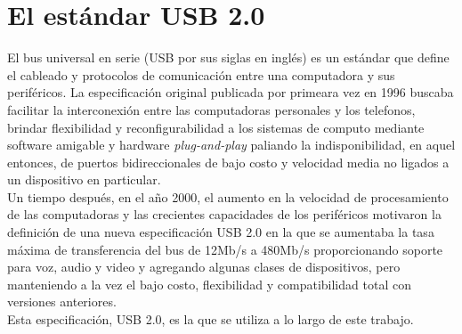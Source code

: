 \documentclass[letterpaper,openright,12pt]{book}
\begin{document}
\section{El estándar USB 2.0}
El bus universal en serie (USB por sus siglas en inglés) es un estándar que define el cableado y protocolos de comunicación entre una computadora y sus periféricos. La especificación original publicada por primeara vez en 1996 buscaba facilitar la interconexión entre las computadoras personales y los telefonos, brindar flexibilidad y reconfigurabilidad a los sistemas de computo mediante software amigable y hardware \emph{plug-and-play} paliando la indisponibilidad, en aquel entonces, de puertos bidireccionales de bajo costo y velocidad media no ligados a un dispositivo en particular.\\
Un tiempo después, en el año 2000, el aumento en la velocidad de procesamiento de las computadoras y las crecientes capacidades de los periféricos motivaron la definición de una nueva especificación USB 2.0 en la que se aumentaba la tasa máxima de transferencia del bus de 12Mb/s a 480Mb/s proporcionando soporte para voz, audio y video y agregando algunas clases de dispositivos, pero manteniendo a la vez el bajo costo, flexibilidad y compatibilidad total con versiones anteriores.\\
Esta especificación, USB 2.0, es la que se utiliza a lo largo de este trabajo.\\
\end{document}
